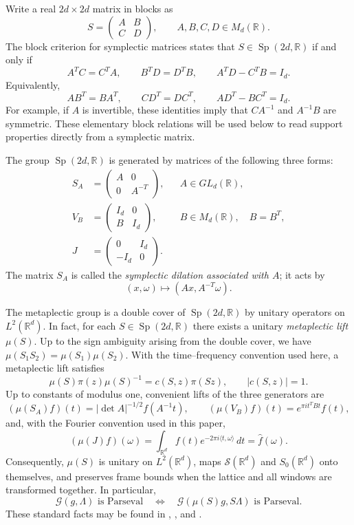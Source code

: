 \documentclass[11pt,reqno]{amsart}
\numberwithin{equation}{section}
\theoremstyle{definition}
\theoremstyle{remark}
\newcommand{\R}{\mathbb R}
\newcommand{\G}{\mathcal G}
\newcommand{\Sclass}{\mathcal S}
\newcommand{\ip}[2]{\langle #1,#2\rangle}
\newcommand{\Sp}{\operatorname{Sp}}
\newcommand{\Szero}{S_0}
\begin{document}
Write a real $2d\times2d$ matrix in blocks as
\[
 S=\begin{pmatrix}A&B\\ C&D\end{pmatrix},
 \qquad A,B,C,D\in M_d(\R).
\]
The block criterion for symplectic matrices
\cite[Lemma~9.4.1(c)]{Grochenig2001} states that $S\in\Sp(2d,\R)$ if and
only if
\begin{equation}\label{eq:symplectic-block-criterion}
 A^TC=C^TA,
 \qquad B^TD=D^TB,
 \qquad A^TD-C^TB=I_d.
\end{equation}
Equivalently,
\begin{equation}\label{eq:symplectic-block-criterion-dual}
 AB^T=BA^T,
 \qquad CD^T=DC^T,
 \qquad AD^T-BC^T=I_d.
\end{equation}
For example, if $A$ is invertible, these identities imply that
$CA^{-1}$ and $A^{-1}B$ are symmetric.  These elementary block relations
will be used below to read support properties directly from a symplectic
matrix.

The group $\Sp(2d,\R)$ is generated by matrices of the following three
forms:
\begin{align*}
 S_A&=\begin{pmatrix}A&0\\0&A^{-T}\end{pmatrix},
       &&A\in GL_d(\R),\\
 V_B&=\begin{pmatrix}I_d&0\\B&I_d\end{pmatrix},
       &&B\in M_d(\R),\quad B=B^T,\\
 J&=\begin{pmatrix}0&I_d\\-I_d&0\end{pmatrix}.
\end{align*}
The matrix $S_A$ is called the \emph{symplectic dilation associated with
$A$}; it acts by
\[
                         (x,\omega)\longmapsto(Ax,A^{-T}\omega).
\]

The metaplectic group is a double cover of $\Sp(2d,\R)$ by unitary
operators on $L^2(\R^d)$.  In fact, for each $S\in\Sp(2d,\R)$ there exists a unitary  \emph{metaplectic lift} $\mu(S)$.  Up to the sign ambiguity arising from the double cover, we have $\mu(S_1S_2)=\mu(S_1)\mu(S_2)$. With the time--frequency convention used here, a
metaplectic lift satisfies
\[
 \mu(S)\pi(z)\mu(S)^{-1}=c(S,z)\pi(Sz),
 \qquad |c(S,z)|=1.
\]
Up to constants of modulus one, convenient lifts of the three generators
are
\[
 (\mu(S_A)f)(t)=|\det A|^{-1/2}f(A^{-1}t),
 \qquad
 (\mu(V_B)f)(t)=e^{\pi i t^TBt}f(t),
\]
and, with the Fourier convention used in this paper,
\[
 (\mu(J)f)(\omega)
 =\int_{\R^d}f(t)e^{-2\pi i\ip{t}{\omega}}\,dt=\widehat f(\omega).
\]
Consequently, $\mu(S)$ is unitary on $L^2(\R^d)$, maps
$\Sclass(\R^d)$ and $\Szero(\R^d)$ onto themselves, and preserves frame
bounds when the lattice and all windows are transformed together.  In
particular,
\[
 \G(g,\Lambda)\text{ is Parseval}
 \quad\Longleftrightarrow\quad
 \G(\mu(S)g,S\Lambda)\text{ is Parseval}.
\]
These standard facts may be found in \cite{Folland1989},
\cite[Section~9.4]{Grochenig2001}, and \cite{GjertsenLuef2024}.
\end{document}
